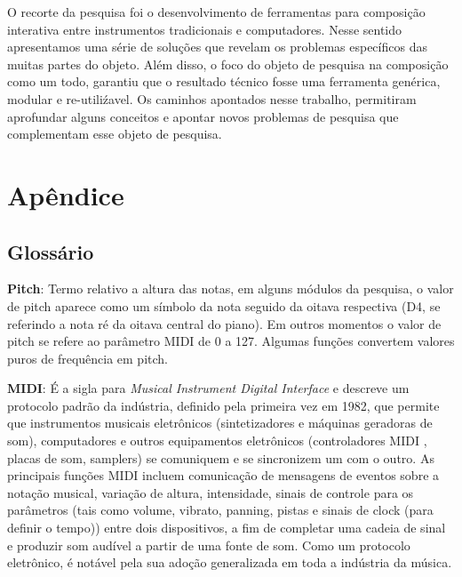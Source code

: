 \documentclass{ppgmus}
\begin{document}
O recorte da pesquisa foi o desenvolvimento de ferramentas para composição
interativa entre instrumentos tradicionais e computadores. 
Nesse sentido apresentamos uma série de soluções que revelam os problemas
específicos das muitas partes do objeto. Além disso, o foco do objeto
de pesquisa na composição como um todo, garantiu que o resultado técnico
fosse uma ferramenta genérica, modular e re-utiliźavel. 
Os caminhos apontados nesse trabalho, permitiram aprofundar alguns conceitos e apontar
novos problemas de pesquisa que complementam esse objeto de pesquisa.

 


\appendix
\chapter{Apêndice}
\label{chap:anexos}


\section{Glossário}
\label{glossario}


\textbf{Pitch}: Termo relativo a altura das notas, em alguns módulos da pesquisa,
o valor de pitch aparece como um símbolo da nota seguido da oitava respectiva (D4, se
referindo a nota ré da oitava central do piano). Em outros momentos o valor de pitch
se refere ao parâmetro MIDI de 0 a 127. Algumas funções convertem valores puros de frequência
em pitch.


\textbf{MIDI}: É a sigla para \textit{Musical Instrument Digital Interface} e descreve um protocolo padrão da indústria, 
definido pela primeira vez em 1982, que permite que instrumentos musicais eletrônicos 
(sintetizadores e máquinas geradoras de som), computadores e outros equipamentos eletrônicos (controladores MIDI , 
placas de som, samplers) se comuniquem e se sincronizem um com o outro. 
As principais funções MIDI incluem comunicação de mensagens de eventos sobre a notação musical,  variação de altura, 
intensidade, sinais de controle para os parâmetros (tais como volume, vibrato, panning, pistas e sinais de 
clock (para definir o tempo)) entre dois dispositivos, a fim de completar uma cadeia de sinal e produzir som 
audível a partir de uma fonte de som. Como um protocolo eletrônico, é notável pela sua adoção generalizada em 
toda a indústria da música.
\end{document}
